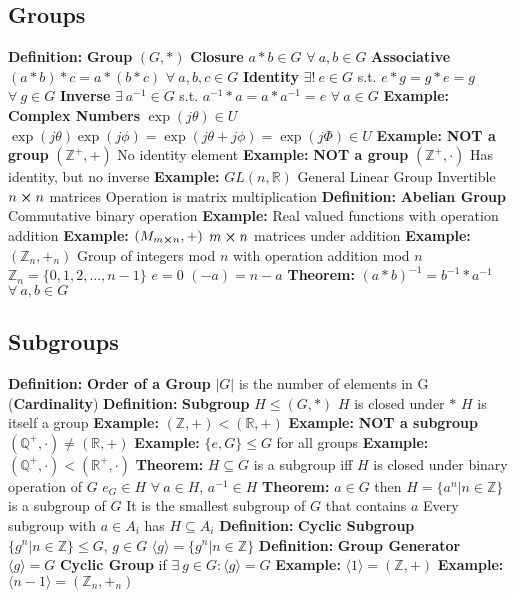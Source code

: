 \documentclass[14pt]{extarticle}
\def\Definition{{\color{blue} \textbf{Definition:} }}
\def\Theorem{{\color{red} \textbf{Theorem:} }}
\def\Example{{\color{violet} \textbf{Example:} }}
\begin{document}
\begin{outline}
		\subsection*{Groups}
		\1	\Definition \textbf{Group}
			\2	$(G,*)$
			\2	\textbf{Closure} $a * b \in G$ $\forall~a,b \in G$
			\2	\textbf{Associative} $(a * b) * c = a*(b*c)$ $\forall~a,b,c \in G$
			\2	\textbf{Identity} $\exists!~e \in G$ s.t. $e*g = g*e = g$ $\forall~g \in G$
			\2	\textbf{Inverse} $\exists~a^{-1} \in G$ s.t. $a^{-1} * a = a * a^{-1} = e$
					$\forall~a \in G$
			\2	\Example \textbf{Complex Numbers}
				\3	$\exp(j\theta) \in U$
				\3	$\exp(j\theta)\exp(j\phi) = \exp(j\theta + j\phi) = \exp(j\Phi) \in U$
			\2	\Example \textbf{NOT a group} $(\mathbb{Z}^+,+)$
				\3	No identity element
			\2	\Example \textbf{NOT a group} $(\mathbb{Z}^+,\cdot)$
				\3	Has identity, but no inverse
			\2	\Example $GL(n,\mathbb{R})$
				\3	General Linear Group
				\3	Invertible $n \cross n$ matrices
				\3	Operation is matrix multiplication
		\1	\Definition \textbf{Abelian Group}
			\2	Commutative binary operation
			\2	\Example Real valued functions with operation addition
			\2	\Example $(M_{m \cross n},+)$ $m \cross n$ matrices under addition
			\2	\Example $(\mathbb{Z}_n,+_n)$
				\3	Group of integers mod $n$ with operation addition mod $n$
				\3	$\mathbb{Z}_n = \{0,1,2,...,n-1\}$
				\3	$e = 0$
				\3	$(-a) = n - a$
		\1	\Theorem $(a * b)^{-1} = b^{-1} * a^{-1}$ $\forall~a,b \in G$
	\subsection*{Subgroups}
		\1	\Definition \textbf{Order of a Group}
			\2	$|G|$ is the number of elements in G (\textbf{Cardinality})
		\1	\Definition \textbf{Subgroup}
			\2	$H \le (G,*)$
			\2	$H$ is closed under $*$
			\2	$H$ is itself a group
			\2	\Example $(\mathbb{Z},+) < (\mathbb{R},+)$
			\2	\Example \textbf{NOT a subgroup} $(\mathbb{Q}^+,\cdot) \ne (\mathbb{R},+)$
			\2	\Example $\{e,G\} \le G$ for all groups
			\2	\Example $(\mathbb{Q}^+,\cdot) < (\mathbb{R}^+,\cdot)$
		\1 \Theorem $H \subseteq G$ is a subgroup iff
			\2	$H$ is closed under binary operation of $G$
			\2	$e_G \in H$
			\2	$\forall~a \in H$, $a^{-1} \in H$
		\1	\Theorem $a \in G$ then $H = \{a^n | n \in \mathbb{Z}\}$ is a subgroup of $G$
			\2	It is the smallest subgroup of $G$ that contains $a$
			\2	Every subgroup with $a \in A_i$ has $H \subseteq A_i$
		\1 \Definition \textbf{Cyclic Subgroup}
			\2	$\{g^n | n \in \mathbb{Z}\} \le G$, $g \in G$
			\2	$\langle g \rangle = \{g^n | n \in \mathbb{Z}\}$
		\1	\Definition \textbf{Group Generator}
			\2	$\langle g \rangle = G$
			\2	\textbf{Cyclic Group} if $\exists~g \in G : \langle g \rangle = G$
			\2	\Example $\langle 1 \rangle = (\mathbb{Z},+)$
			\2	\Example $\langle n - 1 \rangle = (\mathbb{Z}_n,+_n)$

\end{outline}
\end{document}
